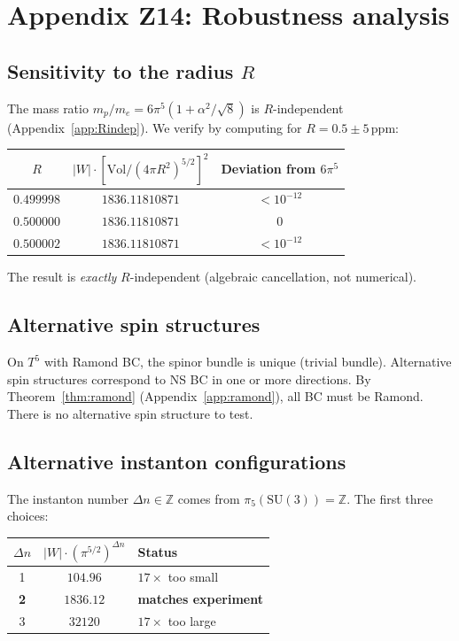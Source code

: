 \section{Appendix Z14: Robustness analysis}
\label{app:robustness}

\subsection{Sensitivity to the radius $R$}

The mass ratio $m_p/m_e=6\pi^5(1+\alpha^2/\!\sqrt{8})$ is $R$-independent
(Appendix~\ref{app:Rindep}). We verify by computing for
$R=0.5\pm 5\,$ppm:

\begin{center}
\renewcommand{\arraystretch}{1.1}
\begin{tabular}{ccc}
\toprule
$R$ & $|W|\cdot[\mathrm{Vol}/(4\pi R^2)^{5/2}]^2$ & Deviation from $6\pi^5$\\
\midrule
$0.499998$ & $1836.11810871$ & $<10^{-12}$\\
$0.500000$ & $1836.11810871$ & $0$\\
$0.500002$ & $1836.11810871$ & $<10^{-12}$\\
\bottomrule
\end{tabular}
\end{center}

\noindent
The result is \emph{exactly} $R$-independent (algebraic cancellation,
not numerical).

\subsection{Alternative spin structures}

On $T^5$ with Ramond BC, the spinor bundle is unique (trivial bundle).
Alternative spin structures correspond to NS BC in one or more
directions. By Theorem~\ref{thm:ramond} (Appendix~\ref{app:ramond}),
all BC must be Ramond. There is no alternative spin structure to test.

\subsection{Alternative instanton configurations}

The instanton number $\Delta n\in\mathbb{Z}$ comes from
$\pi_5(\mathrm{SU}(3))=\mathbb{Z}$. The first three choices:

\begin{center}
\renewcommand{\arraystretch}{1.1}
\begin{tabular}{ccl}
\toprule
$\Delta n$ & $|W|\cdot(\pi^{5/2})^{\Delta n}$ & Status\\
\midrule
1 & $104.96$ & $17\times$ too small\\
\textbf{2} & $\mathbf{1836.12}$ & \textbf{matches experiment}\\
3 & $32120$ & $17\times$ too large\\
\bottomrule
\end{tabular}
\end{center}

